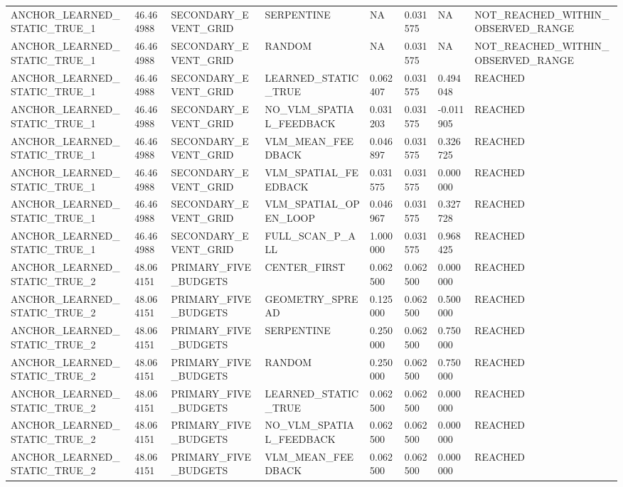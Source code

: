 \begin{tabular}{llllllll}
ANCHOR\_LEARNED\_STATIC\_TRUE\_1 & 46.464988 & SECONDARY\_EVENT\_GRID & SERPENTINE & NA & 0.031575 & NA & NOT\_REACHED\_WITHIN\_OBSERVED\_RANGE \\
ANCHOR\_LEARNED\_STATIC\_TRUE\_1 & 46.464988 & SECONDARY\_EVENT\_GRID & RANDOM & NA & 0.031575 & NA & NOT\_REACHED\_WITHIN\_OBSERVED\_RANGE \\
ANCHOR\_LEARNED\_STATIC\_TRUE\_1 & 46.464988 & SECONDARY\_EVENT\_GRID & LEARNED\_STATIC\_TRUE & 0.062407 & 0.031575 & 0.494048 & REACHED \\
ANCHOR\_LEARNED\_STATIC\_TRUE\_1 & 46.464988 & SECONDARY\_EVENT\_GRID & NO\_VLM\_SPATIAL\_FEEDBACK & 0.031203 & 0.031575 & -0.011905 & REACHED \\
ANCHOR\_LEARNED\_STATIC\_TRUE\_1 & 46.464988 & SECONDARY\_EVENT\_GRID & VLM\_MEAN\_FEEDBACK & 0.046897 & 0.031575 & 0.326725 & REACHED \\
ANCHOR\_LEARNED\_STATIC\_TRUE\_1 & 46.464988 & SECONDARY\_EVENT\_GRID & VLM\_SPATIAL\_FEEDBACK & 0.031575 & 0.031575 & 0.000000 & REACHED \\
ANCHOR\_LEARNED\_STATIC\_TRUE\_1 & 46.464988 & SECONDARY\_EVENT\_GRID & VLM\_SPATIAL\_OPEN\_LOOP & 0.046967 & 0.031575 & 0.327728 & REACHED \\
ANCHOR\_LEARNED\_STATIC\_TRUE\_1 & 46.464988 & SECONDARY\_EVENT\_GRID & FULL\_SCAN\_P\_ALL & 1.000000 & 0.031575 & 0.968425 & REACHED \\
ANCHOR\_LEARNED\_STATIC\_TRUE\_2 & 48.064151 & PRIMARY\_FIVE\_BUDGETS & CENTER\_FIRST & 0.062500 & 0.062500 & 0.000000 & REACHED \\
ANCHOR\_LEARNED\_STATIC\_TRUE\_2 & 48.064151 & PRIMARY\_FIVE\_BUDGETS & GEOMETRY\_SPREAD & 0.125000 & 0.062500 & 0.500000 & REACHED \\
ANCHOR\_LEARNED\_STATIC\_TRUE\_2 & 48.064151 & PRIMARY\_FIVE\_BUDGETS & SERPENTINE & 0.250000 & 0.062500 & 0.750000 & REACHED \\
ANCHOR\_LEARNED\_STATIC\_TRUE\_2 & 48.064151 & PRIMARY\_FIVE\_BUDGETS & RANDOM & 0.250000 & 0.062500 & 0.750000 & REACHED \\
ANCHOR\_LEARNED\_STATIC\_TRUE\_2 & 48.064151 & PRIMARY\_FIVE\_BUDGETS & LEARNED\_STATIC\_TRUE & 0.062500 & 0.062500 & 0.000000 & REACHED \\
ANCHOR\_LEARNED\_STATIC\_TRUE\_2 & 48.064151 & PRIMARY\_FIVE\_BUDGETS & NO\_VLM\_SPATIAL\_FEEDBACK & 0.062500 & 0.062500 & 0.000000 & REACHED \\
ANCHOR\_LEARNED\_STATIC\_TRUE\_2 & 48.064151 & PRIMARY\_FIVE\_BUDGETS & VLM\_MEAN\_FEEDBACK & 0.062500 & 0.062500 & 0.000000 & REACHED \\

\end{tabular}
